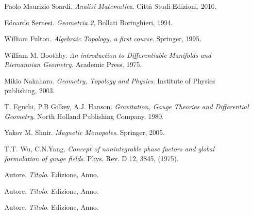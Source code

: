 \begin{thebibliography}{9}
   Paolo Maurizio Soardi.
   \textit{Analisi Matematica}.
   Città Studi Edizioni, 2010.

   Edoardo Sernesi.
   \textit{Geometria 2}.
   Bollati Boringhieri, 1994.

  William Fulton.
  \textit{Algebraic Topology, a first course}.
  Springer, 1995.

   William M. Boothby.
   \textit{An introduction to Differentiable Manifolds and Riemannian Geometry}.
   Academic Press, 1975.

   Mikio Nakahara.
   \textit{Geometry, Topology and Physics}.
   Institute of Physics publishing, 2003.

  T. Eguchi, P.B Gilkey, A.J. Hanson.
  \textit{Gravitation, Gauge Theories and Differential Geometry}.
  North Holland Publishing Company, 1980.

  Yakov M. Shnir.
  \textit{Magnetic Monopoles}.
  Springer, 2005.

   T.T. Wu, C.N.Yang.
   \textit{Concept of nonintegrable phase factors and global formulation of gauge fields}.
   Phys. Rev. D 12, 3845, (1975).

   Autore.
   \textit{Titolo}.
   Edizione, Anno.

  Autore.
  \textit{Titolo}.
  Edizione, Anno.

  Autore.
  \textit{Titolo}.
  Edizione, Anno.

\end{thebibliography}

